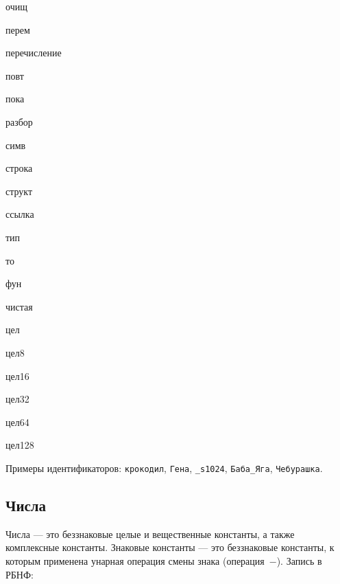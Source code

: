 \documentclass[10pt]{report}
\begin{document}
\begin{multicols}{4}
очищ

перем

перечисление

повт

пока

разбор

симв

строка

структ

ссылка

тип

то

фун

чистая

цел

цел8

цел16

цел32

цел64

цел128

\end{multicols}

Примеры идентификаторов: \texttt{крокодил}, \texttt{Гена}, \texttt{_s1024}, \texttt{Баба_Яга}, \texttt{Чебурашка}.    


        \subsection{Числа}
Числа --- это беззнаковые целые и вещественные константы, а также комплексные константы. Знаковые константы --- это беззнаковые константы, к которым применена унарная операция смены знака
(операция\ \glqq$-$\grqq). Запись в РБНФ:
\end{document}
